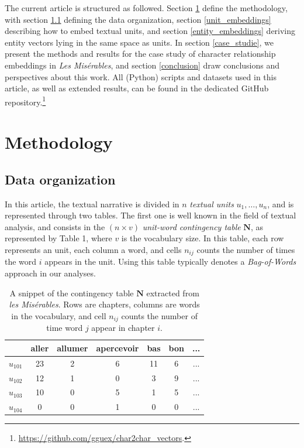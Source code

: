 \documentclass[
twocolumn,
]{ceurart}
\begin{document}
The current article is structured as followed. Section \ref{methodology} define the methodology, with section \ref{data} defining the data organization, section  \ref{unit_embeddings} describing how to embed textual units, and section \ref{entity_embeddings} deriving entity vectors lying in the same space as units. In section \ref{case_studie}, we present the methods and results for the case study of character relationship embeddings in \emph{Les Misérables}, and section \ref{conclusion} draw conclusions and perspectives about this work. All (Python) scripts and datasets used in this article, as well as extended results, can be found in the dedicated GitHub repository.\footnote{\url{https://github.com/gguex/char2char_vectors}.}

\section{Methodology}
\label{methodology}

\subsection{Data organization}
\label{data}

In this article, the textual narrative is divided in $n$ \emph{textual units} $u_1, \ldots, u_n$, and is represented through two tables. The first one is well known in the field of textual analysis, and consists in the $(n \times v)$ \emph{unit-word contingency table} $\mathbf{N}$, as represented by Table 1, where $v$ is the vocabulary size. In this table, each row represents an unit, each column a word, and cells $n_{ij}$ counts the number of times the word $i$ appears in the unit. Using this table typically denotes a \emph{Bag-of-Words} approach in our analyses.

\begin{table}[h]
	\scriptsize
	\begin{tabular}{|c||c|c|c|c|c|c|}
		\hline
		& aller & allumer & apercevoir & bas & bon & ... \\
		\hline
		\hline 
		$u_{101}$ & 23 & 2 & 6 & 11 & 6 & ... \\
		\hline
		$u_{102}$ & 12 & 1 & 0 & 3 & 9 & ... \\
		\hline
		$u_{103}$ & 10 & 0 & 5 & 1 & 5 & ... \\
		\hline
		$u_{104}$ & 0 & 0 & 1 & 0 & 0 & ... \\
		\hline
	\end{tabular}
	\label{cont_table}
	\caption{A snippet of the contingency table $\mathbf{N}$ extracted from \emph{les Misérables}. Rows are chapters, columns are words in the vocabulary, and cell $n_{ij}$ counts the number of time word $j$ appear in chapter $i$.}
\end{table}
\end{document}
